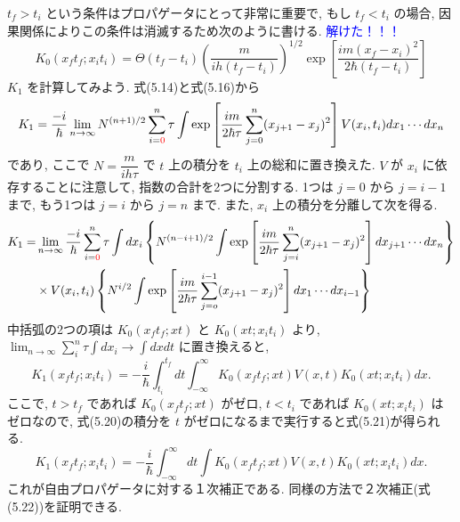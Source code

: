 \documentclass{jsarticle}
\begin{document}
$t_{f} > t_i$ という条件はプロパゲータにとって非常に重要で, もし $t_{f} < t_i$ の場合, 因果関係によりこの条件は消滅するため次のように書ける. \textcolor{blue}{解けた！！！}
\begin{equation*}
    K_{0}(x_{f}t_{f}; x_{i}t_{i}) = \Theta(t_{f} - t_{i})\left( \frac{m}{ih(t_{f} - t_{i})} \right)^{1/2} \exp\left[ \frac{im(x_{f} - x_{i})^2}{2\hbar(t_{f} - t_{i})} \right] \tag{5.19}
\end{equation*}
$K_{1}$ を計算してみよう. 式(5.14)と式(5.16)から
\begin{equation*}
    K_{1} = \frac{-i}{\hbar}\lim_{n \rightarrow \infty} N^{(n+1)/2}\sum_{i=\textcolor{red}{0}}^{n}\tau\int\exp\left[ \frac{im}{2\hbar\tau}\sum_{j=0}^{n}(x_{j+1} - x_{j})^2 \right] V(x_{i}, t_{i}) dx_1 \cdots dx_{n}
\end{equation*}
であり, ここで $N = \dfrac{m}{ih\tau}$ で $t$ 上の積分を $t_{i}$ 上の総和に置き換えた. $V$ が $x_{i}$ に依存することに注意して, 指数の合計を2つに分割する. 1つは $j=0$ から $j=i-1$ まで, もう1つは $j=i$ から $j=n$ まで. また, $x_{i}$ 上の積分を分離して次を得る.
\begin{align*}
    K_1 = &\lim_{n\rightarrow\infty}\frac{-i}{\hbar}\sum_{i=\textcolor{red}{0}}^{n}\tau\int dx_{i} \left\{ N^{(n-i+1)/2}\int\exp\left[ \frac{im}{2\hbar\tau}\sum_{j=i}^{n}(x_{j+1} - x_{j})^2 \right]dx_{j+1}\cdots dx_{n} \right\}\\
    &\times V(x_{i}, t_{i})\left\{ N^{i/2}\int\exp \left[ \frac{im}{2\hbar\tau}\sum_{j=o}^{i-1}(x_{j+1} - x_{j})^2 \right] dx_1 \cdots dx_{i-1} \right\} 
\end{align*}
中括弧の2つの項は $K_{0}(x_{f}t_{f}; xt)$ と $K_{0}(xt; x_{i}t_{i})$ より, $\displaystyle \lim_{n \to \infty} \sum_{i}^{n}\tau\int dx_{i} \to \int dx dt$ に置き換えると,
\begin{equation*}
    K_{1}(x_{f}t_{f}; x_{i}t_{i}) = -\frac{i}{\hbar}\int_{t_i}^{t_f}dt\int_{-\infty}^{\infty} K_{0}(x_{f}t_{f}; xt)V(x, t)K_{0}(xt; x_{i}t_{i})dx. \tag{5.20}
\end{equation*}
ここで, $t > t_f$ であれば $K_{0}(x_{f}t_{f}; xt)$ がゼロ, $t < t_i$ であれば $K_{0}(xt; x_{i}t_{i})$ はゼロなので, 式(5.20)の積分を $t$ がゼロになるまで実行すると式(5.21)が得られる.
\begin{equation*}
    K_{1}(x_{f}t_{f}; x_{i}t_{i}) = -\frac{i}{\hbar}\int_{-\infty}^{\infty}dt\int K_{0}(x_{f}t_{f}; xt)V(x, t)K_{0}(xt; x_{i}t_{i})dx. \tag{5.21}
\end{equation*}
これが自由プロパゲータに対する１次補正である. 同様の方法で２次補正(式(5.22))を証明できる.
\end{document}
